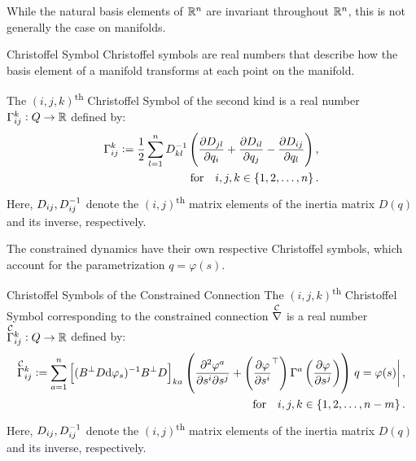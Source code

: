 \documentclass[main.tex]{subfiles}
\begin{document}
While the natural basis elements of $\mathbb{R}^n$ are invariant throughout $\mathbb{R}^n$, this is not generally the case on manifolds.
\begin{boxdef}{Christoffel Symbol}\label{eq:christoffel}
Christoffel symbols are real numbers that describe how the basis element of a manifold transforms at each point on the manifold. 

The $(i,j,k)$\textsuperscript{th} Christoffel Symbol of the second kind is a real number $\Gamma^k_{ij}:Q\to\mathbb{R}$ defined by:
\begin{align}
   \Gamma^k_{ij}:=\frac{1}{2}\sum_{l=1}^n D\inv_{kl}\del{\pdv{D_{jl}}{q_i}+\pdv{D_{il}}{q_j}-\pdv{D_{ij}}{q_l}},\\\qq{for} i,j,k\in\cbr{1,2,\ldots,n}. 
\end{align}
Here, $D_{ij},D^{-1}_{ij}$ denote the $(i,j)$\textsuperscript{th} matrix elements of the inertia matrix $D(q)$ and its inverse, respectively.
\end{boxdef}

The constrained dynamics have their own respective Christoffel symbols, which account for the parametrization $q=\varphi(s)$.
\begin{boxdef}{Christoffel Symbols of the Constrained Connection}\label{eq:christoffelconstrained}
The $(i,j,k)$\textsuperscript{th} Christoffel Symbol corresponding to the constrained connection $\nablac$ is a real number $\Gammac{k}{ij}:Q\to\ree$ defined by:
\begin{align}
   \Gammac{k}{ij}:=\sum^n_{a=1}
   \sbr{(B^\bot D\dd\varphi_s)\inv B^\bot D}_{ka}
   \del{\pdv{\varphi^a}{s^i}{s^j}+\del{\pdv{\varphi}{s^i}^\top}\Gamma^a\del{\pdv{\varphi}{s^j}}}\eval{q=\varphi(s)}
   ,\\\qq{for} i,j,k\in\cbr{1,2,\ldots,n-m}. 
\end{align}
Here, $D_{ij},D^{-1}_{ij}$ denote the $(i,j)$\textsuperscript{th} matrix elements of the inertia matrix $D(q)$ and its inverse, respectively.
\end{boxdef}
    
\end{document}
